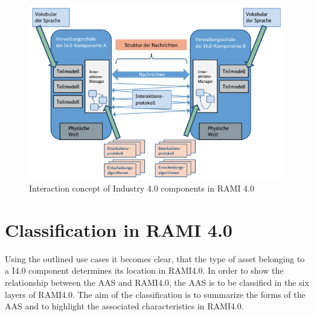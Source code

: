 \begin{figure}[h]
\centering
\includegraphics[scale=0.7]{content/pictures/interaction_i40_components.png}
\caption{Interaction concept of Industry 4.0 components in RAMI 4.0}
\label{fig:interaction-concept-i40}
\end{figure}

\section{Classification in RAMI 4.0}

Using the outlined use cases it becomes clear, that the type of asset belonging to a \ac{I4.0} component determines its location in \ac{RAMI4.0}. In order to show the relationship between the \ac{AAS} and \ac{RAMI4.0}, the \ac{AAS} is to be classified in the six layers of \ac{RAMI4.0}. The aim of the classification is to summarize the forms of the \ac{AAS} and to highlight the associated characteristics in \ac{RAMI4.0}.

